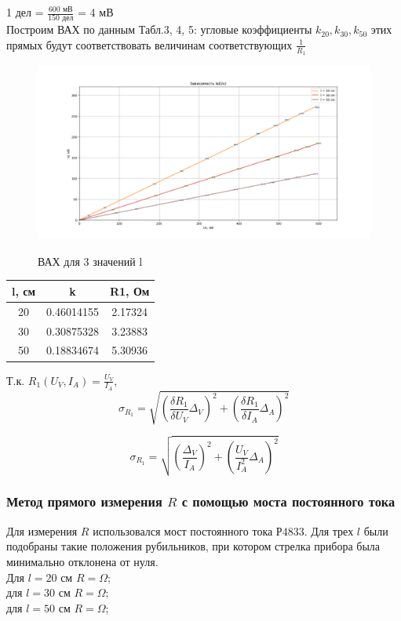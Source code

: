 \documentclass{article}
\begin{document}
	1 дел = $\frac{600 \text{ мВ}}{150 \text{ дел}}$ = 4 мВ\\
	
	Построим ВАХ по данным Табл.3, 4, 5: угловые коэффициенты $k_{20}, k_{30}, k_{50}$ этих прямых будут соответствовать величинам соответствующих $\frac{1}{R_{1}}$ 
	
	
	\begin{figure}[H]
		\centering
		 {
			\includegraphics[width = 1.4\linewidth]{Figure_1.png}}
		\caption{ВАХ для 3 значений l}
		\label{fig:enter-label}
	\end{figure}
	
	
	\begin{table}[ht]
		\centering
		\begin{tabular}{|c|c|c|}
			\hline
			l, см & k & R1, Ом \\ \hline
			20 & 0.46014155 & 2.17324 \\ \hline
			30 & 0.30875328 & 3.23883 \\ \hline
			50 & 0.18834674 & 5.30936 \\ \hline
		\end{tabular}
	\end{table}
	
	Т.к. $R_{1}(U_{V}, I_{A}) = \frac{U_{V}}{I_{A}}$,
	\[\sigma_{R_{1}} = \sqrt{ (\frac{\delta R_{1}}{\delta U_{V}}\Delta_{V})^{2} + (\frac{\delta R_{1}}{\delta I_{A}}\Delta_{A})^{2} }\]
	
	\[\sigma_{R_{1}} = \sqrt{ (\frac{\Delta_{V}}{I_{A}})^{2} + (\frac{U_{V}}{I_{A}^{2}}\Delta_{A})^{2} }\]
	
	\subsubsection{Метод прямого измерения $R$ с помощью моста постоянного тока}
	Для измерения $R$ использовался мост постоянного тока Р4833. Для трех $l$ были подобраны такие положения рубильников, при котором стрелка прибора была минимально отклонена от нуля.\\
	Для $l = 20 \text{ см}$ $R = \Omega$;\\
	для $l = 30 \text{ см}$ $R = \Omega$;\\
	для $l = 50 \text{ см}$ $R = \Omega$;\\
	
	
	
	
\end{document}
